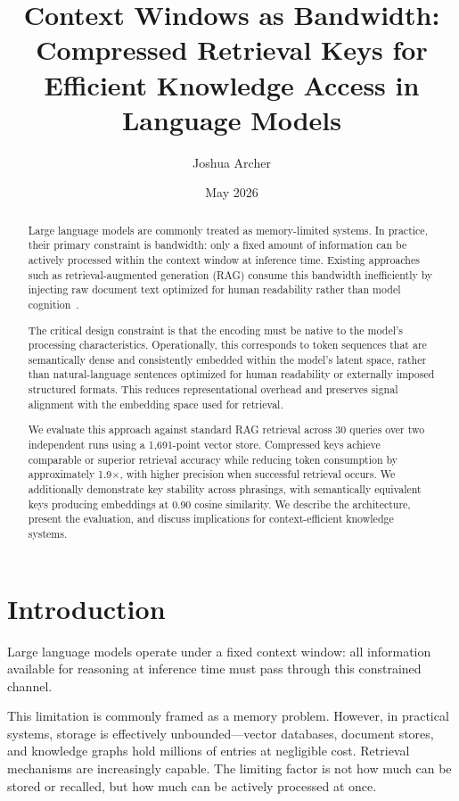 \documentclass{article}
\title{Context Windows as Bandwidth:\\
Compressed Retrieval Keys for Efficient Knowledge Access in Language Models}
\author{Joshua Archer}
\date{May 2026}
\begin{document}
\maketitle

\begin{abstract}
Large language models are commonly treated as memory-limited systems. In practice, their primary constraint is bandwidth: only a fixed amount of information can be actively processed within the context window at inference time.
Existing approaches such as retrieval-augmented generation (RAG) consume this bandwidth inefficiently by injecting raw document text optimized for human readability rather than model cognition~\cite{lewis2020rag}.

The critical design constraint is that the encoding must be native to the model's processing
characteristics. Operationally, this corresponds to token sequences that are semantically dense and consistently embedded within the model’s latent space, rather than natural-language sentences optimized for human readability or externally imposed structured formats. This reduces representational overhead and preserves signal alignment with the embedding space used for retrieval.

We evaluate this approach against standard RAG retrieval across 30 queries over two independent runs using a 1,691-point vector store. Compressed keys achieve comparable or superior retrieval accuracy while reducing token consumption by approximately 1.9$\times$, with higher precision when successful retrieval occurs. We additionally demonstrate key stability across phrasings, with semantically equivalent keys producing embeddings at 0.90 cosine similarity. We describe the architecture, present the evaluation, and discuss implications for context-efficient knowledge systems.
\end{abstract}

\section{Introduction}

Large language models operate under a fixed context window: all information available for reasoning at inference time must pass through this constrained channel.

This limitation is commonly framed as a memory problem. However, in practical systems, storage is effectively unbounded---vector databases, document stores, and knowledge graphs hold millions of entries at negligible cost. Retrieval mechanisms are increasingly capable. The limiting factor is not how much can be stored or recalled, but how much can be actively processed at once.
\end{document}
